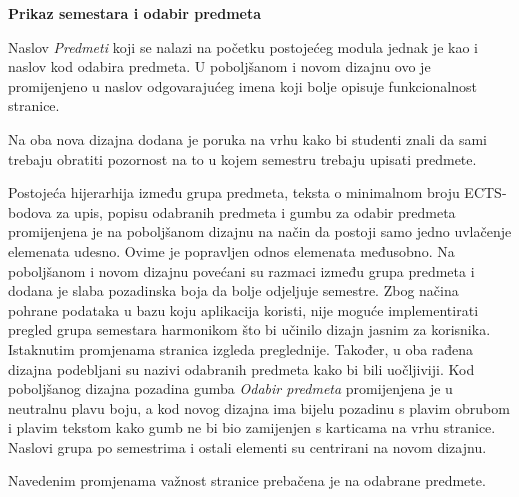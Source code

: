 \documentclass[times, utf8, zavrsni, numeric]{fer}
\begin{document}
    \noindent\textbf{Prikaz semestara i odabir predmeta}
    
    Naslov \textit{Predmeti} koji se nalazi na početku postojećeg modula jednak je kao i naslov kod odabira predmeta. U poboljšanom i novom dizajnu ovo je promijenjeno u naslov odgovarajućeg imena koji bolje opisuje funkcionalnost stranice.
    
    Na oba nova dizajna dodana je poruka na vrhu kako bi studenti znali da sami trebaju obratiti pozornost na to u kojem semestru trebaju upisati predmete.
    
    Postojeća hijerarhija između grupa predmeta, teksta o minimalnom broju ECTS-bodova za upis, popisu odabranih predmeta i gumbu za odabir predmeta promijenjena je na poboljšanom dizajnu na način da postoji samo jedno uvlačenje elemenata udesno. Ovime je popravljen odnos elemenata međusobno. Na poboljšanom i novom dizajnu povećani su razmaci između grupa predmeta i dodana je slaba pozadinska boja da bolje odjeljuje semestre. Zbog načina pohrane podataka u bazu koju aplikacija koristi, nije moguće implementirati pregled grupa semestara harmonikom što bi učinilo dizajn jasnim za korisnika. Istaknutim promjenama stranica izgleda preglednije. Također, u oba rađena dizajna podebljani su nazivi odabranih predmeta kako bi bili uočljiviji. Kod poboljšanog dizajna pozadina gumba \textit{Odabir predmeta} promijenjena je u neutralnu plavu boju, a kod novog dizajna ima bijelu pozadinu s plavim obrubom i plavim tekstom kako gumb ne bi bio zamijenjen s karticama na vrhu stranice. Naslovi grupa po semestrima i ostali elementi su centrirani na novom dizajnu.
    
    Navedenim promjenama važnost stranice prebačena je na odabrane predmete.
    
\end{document}
